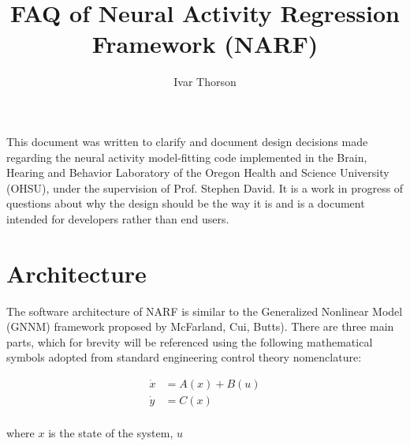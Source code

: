 \documentclass{article}
\title{FAQ of Neural Activity Regression Framework (NARF)}
\author{Ivar Thorson}
\newcommand{\definition}{\textbf{#1}}
\begin{document}
  
This document was written to clarify and document design decisions made regarding the neural activity model-fitting code implemented in the Brain, Hearing and Behavior Laboratory of the Oregon Health and Science University (OHSU), under the supervision of Prof. Stephen David. It is a work in progress of questions about why the design should be the way it is and is a document intended for developers rather than end users.

\section{Architecture}

The software architecture of NARF is similar to the Generalized Nonlinear Model (GNNM) framework proposed by McFarland, Cui, Butts). There are three main parts, which for brevity will be referenced using the following mathematical symbols adopted from standard engineering control theory nomenclature:

\begin{eqnarray}
 \dot{x} & = A(x) + B(u)\\
 \dot{y} & = C(x) \\
\end{eqnarray}

where $x$ is the state of the system, $u$ 


\end{document}
